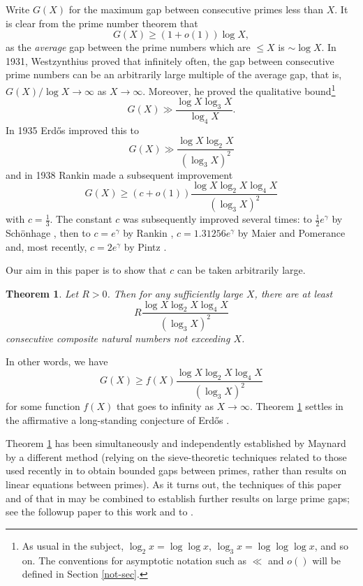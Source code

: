 \documentclass[11pt]{amsart}
\numberwithin{equation}{section}  %
\theoremstyle{remark}
\theoremstyle{plain}
\newtheorem{thm}{Theorem}
\numberwithin{equation}{section}
\renewcommand{\le}{\leqslant}
\renewcommand{\geq}{\geqslant}
\renewcommand{\(}{\left(}
\renewcommand{\)}{\right)}
\newcommand{\asym}{\sim}   %
\begin{document}
Write $G(X)$ for the maximum gap between consecutive primes less than $X$. It is clear from the prime number theorem that
\[ G(X) \geq (1 + o(1)) \log X,\]
as the \emph{average} gap between the prime numbers which are $\le X$ is $\asym \log X$. 
In 1931, Westzynthius \cite{West} proved that infinitely often, the gap between consecutive 
prime numbers can be an arbitrarily large multiple of the average gap, that is,
$G(X)/\log X\to \infty$ as $X\to\infty$.  Moreover, he proved the qualitative
bound\footnote{As usual in the subject, $\log_2 x = \log \log x$, $\log_3 x = \log \log \log x$, and so on.  The conventions for asymptotic notation such as $\ll$ and $o()$ will be defined in Section \ref{not-sec}.}
\[
G(X) \gg \frac{\log X \log_3 X}{\log_4 X}.
\]
In 1935 Erd\H{o}s \cite{erdos-gaps} improved this to
\[ G(X) \gg \frac{\log X \log_2X}{(\log_3X)^2}\] and in 1938 Rankin \cite{R1} 
made a subsequent improvement
\[ G(X) \geq (c + o(1)) \frac{\log X \log_2 X \log_4 X}{(\log_3 X)^2}\] with $c = \frac{1}{3}$. The constant $c$ was subsequently improved several times: to $\frac{1}{2}e^{\gamma}$ by Sch\"onhage \cite{schonhage}, then to $c = e^{\gamma}$ by Rankin \cite{rankin-1963}, $c = 1.31256 e^{\gamma}$ by Maier and Pomerance \cite{MP} and, most recently, $c = 2e^{\gamma}$ by Pintz \cite{P}.

Our aim in this paper is to show that $c$ can be taken arbitrarily large.

\begin{thm}\label{mainthm} Let $R>0$.  Then for any sufficiently large $X$,
there are at least
$$R\frac{\log X \log_2 X \log_4 X}{(\log_3 X)^2}$$
consecutive composite natural numbers not exceeding $X$.
\end{thm}

In other words, we have
$$ G(X) \geq f(X) \frac{\log X \log_2 X \log_4 X}{(\log_3 X)^2}$$
for some function $f(X)$ that goes to infinity as $X \to \infty$.
Theorem \ref{mainthm} settles in the affirmative a long-standing conjecture of
Erd\H os \cite{Erd90}.

Theorem \ref{mainthm} has been simultaneously and independently established by Maynard \cite{maynard} by a different method (relying on the sieve-theoretic techniques related to those used recently in \cite{maynard-small} to obtain bounded gaps between primes, rather than results on linear equations between primes).  As it turns out, the techniques of this paper and of that in \cite{maynard} may be combined to establish further results on large prime gaps; see the followup paper \cite{FGKMT} to this work and to \cite{maynard}.
\end{document}
